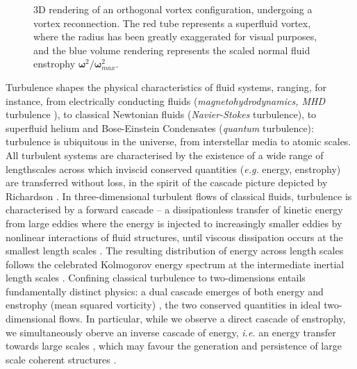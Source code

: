 \documentclass[%
 reprint,
 amsmath,amssymb,
 aps,
 prl,
]{revtex4-2}
\newcommand{\bom}{\boldsymbol{\omega}}
\begin{document}
\begin{figure}
\begin{subfigure}[b]{0.24\textwidth}
	\end{subfigure}
    \hfill
	\caption{3D rendering of an orthogonal vortex configuration, undergoing a vortex reconnection. The red tube represents a superfluid vortex, where the radius has been greatly exaggerated for visual purposes, and the blue volume rendering represents the scaled normal fluid enstrophy $\bom^2/\bom^2_{max}$.}
    \label{fig:visualisation}
\end{figure}

Turbulence shapes the physical characteristics of fluid systems, ranging, for instance, from electrically conducting fluids (\textit{magnetohydrodynamics, MHD} turbulence \cite{canuto-dalsgaard-1998}), to classical Newtonian fluids (\textit{Navier-Stokes} turbulence\cite{frisch1995}), to superfluid helium and Bose-Einstein Condensates (\textit{quantum} turbulence\cite{barenghi-etal-2023,Barenghi_Skrbek_Sreenivasan_2023}): turbulence is ubiquitous in the universe, from interstellar media to atomic scales. All turbulent systems are characterised by the existence of a wide range of lengthscales across which inviscid conserved quantities (\textit{e.g.} energy, enstrophy) are transferred without loss, in the spirit of the cascade picture depicted by Richardson \cite{richardson1922weather}. 
%
In three-dimensional turbulent flows of classical fluids, turbulence is characterised by a forward cascade -- a dissipationless transfer of kinetic energy from large eddies where the energy is injected to increasingly smaller eddies by nonlinear interactions of fluid structures, until viscous dissipation occurs at the smallest length scales \cite{richardson1922weather,kolmogorov-1941}. The resulting distribution of energy across length scales follows the celebrated Kolmogorov energy spectrum 
at the intermediate inertial length scales \cite{kolmogorov-1941,frisch1995}. Confining classical turbulence to two-dimensions entails fundamentally distinct physics: a dual cascade emerges of both energy and enstrophy (mean squared vorticity) \cite{kraichnan-1967,boffetta-ecke-2012}, the two conserved quantities in ideal two-dimensional flows. In particular, while we observe a direct cascade of enstrophy, we simultaneously oberve an inverse cascade of energy, \textit{i.e.} an energy transfer towards large scales \cite{boffetta-musacchio-2010},  
which may favour the generation and persistence of large scale coherent structures \cite{laurie-etal-2014}. 
\end{document}
